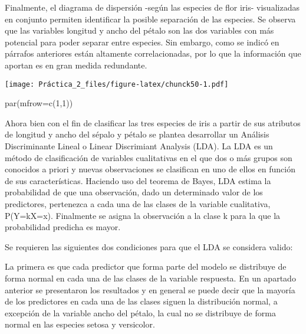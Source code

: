 \documentclass[
]{article}
\newenvironment{Shaded}{\begin{snugshade}}{\end{snugshade}}
\newcommand{\AttributeTok}[1]{\textcolor[rgb]{0.77,0.63,0.00}{#1}}
\newcommand{\CommentTok}[1]{\textcolor[rgb]{0.56,0.35,0.01}{\textit{#1}}}
\newcommand{\DecValTok}[1]{\textcolor[rgb]{0.00,0.00,0.81}{#1}}
\newcommand{\FunctionTok}[1]{\textcolor[rgb]{0.00,0.00,0.00}{#1}}
\newcommand{\NormalTok}[1]{#1}
\newcommand{\SpecialCharTok}[1]{\textcolor[rgb]{0.00,0.00,0.00}{#1}}
\newcommand{\StringTok}[1]{\textcolor[rgb]{0.31,0.60,0.02}{#1}}
\begin{document}
Finalmente, el diagrama de dispersión -según las especies de flor iris-
visualizadas en conjunto permiten identificar la posible separación de
las especies. Se observa que las variables longitud y ancho del pétalo
son las dos variables con más potencial para poder separar entre
especies. Sin embargo, como se indicó en párrafos anteriores están
altamente correlacionadas, por lo que la información que aportan es en
gran medida redundante.

\begin{Shaded}
\end{Shaded}

\texttt{[image: Práctica\_2\_files/figure-latex/chunck50-1.pdf]}

\begin{Shaded}
\begin{Highlighting}[]
\FunctionTok{par}\NormalTok{(}\AttributeTok{mfrow=}\FunctionTok{c}\NormalTok{(}\DecValTok{1}\NormalTok{,}\DecValTok{1}\NormalTok{))}
\end{Highlighting}
\end{Shaded}

Ahora bien con el fin de clasificar las tres especies de iris a partir
de sus atributos de longitud y ancho del sépalo y pétalo se plantea
desarrollar un Análisis Discriminante Lineal o Linear Discrimiant
Analysis (LDA). La LDA es un método de clasificación de variables
cualitativas en el que dos o más grupos son conocidos a priori y nuevas
observaciones se clasifican en uno de ellos en función de sus
características. Haciendo uso del teorema de Bayes, LDA estima la
probabilidad de que una observación, dado un determinado valor de los
predictores, pertenezca a cada una de las clases de la variable
cualitativa, P(Y=k\textbar X=x). Finalmente se asigna la observación a
la clase k para la que la probabilidad predicha es mayor.

Se requieren las siguientes dos condiciones para que el LDA se considera
valido:

La primera es que cada predictor que forma parte del modelo se
distribuye de forma normal en cada una de las clases de la variable
respuesta. En un apartado anterior se presentaron los resultados y en
general se puede decir que la mayoría de los predictores en cada una de
las clases siguen la distribución normal, a excepción de la variable
ancho del pétalo, la cual no se distribuye de forma normal en las
especies setosa y versicolor.
\end{document}
